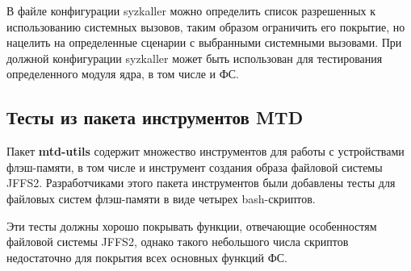 В файле конфигурации syzkaller можно определить список разрешенных к использованию системных вызовов, таким образом ограничить его покрытие, но нацелить на определенные сценарии с выбранными системными вызовами. При должной конфигурации syzkaller может быть использован для тестирования определенного модуля ядра, в том числе и ФС. 

\subsection{Тесты из пакета инструментов MTD}

Пакет \textbf{mtd-utils} содержит множество инструментов для работы с устройствами флэш-памяти, в том числе и инструмент создания образа файловой системы JFFS2. Разработчиками этого пакета инструментов были добавлены тесты для файловых систем флэш-памяти в виде четырех bash-скриптов.

Эти тесты должны хорошо покрывать функции, отвечающие особенностям файловой системы JFFS2, однако такого небольшого числа скриптов недостаточно для покрытия всех основных функций ФС.

\newpage
